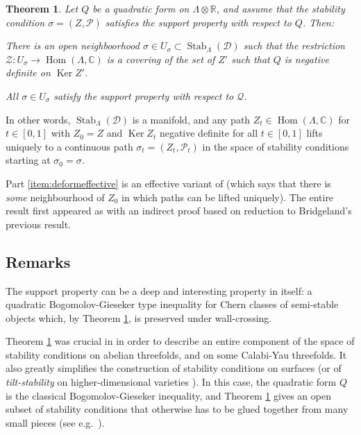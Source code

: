 \documentclass[leqno,11pt,twoside]{amsart}
\makeatletter
\newtheorem*{rep@theorem}{{Conjecture} \ref##}
\newtheorem{Thm}{Theorem}[section]
{\newenvironment{rep{Thm}}[1]{ } \begin{rep@theorem}} \end{rep@theorem}}
\theoremstyle{definition}
\makeatother
\begin{document}
\begin{Thm} \label{thm:mainthm}
Let $Q$ be a quadratic form on $\Lambda \otimes {\ensuremath{\mathbb{R}}}$, and assume that the stability condition
$\sigma = (Z, {\ensuremath{\mathcal P}})$ satisfies the support property with respect to $Q$. Then:
\begin{enumerate*}
\item \label{item:deformeffective}
There is an open neighboorhood $\sigma \in U_\sigma \subset {\mathop{\mathrm{Stab}}\nolimits}_\Lambda({\ensuremath{\mathcal D}})$ such that the
restriction ${\ensuremath{\mathcal Z}} \colon U_\sigma \to {\mathop{\mathrm{Hom}}\nolimits}(\Lambda, {\ensuremath{\mathbb{C}}})$ is a covering of the set of 
$Z'$ such that $Q$ is negative definite on ${\mathop{\mathrm{Ker}}\nolimits} Z'$.
\item \label{item:Qremains}
All $\sigma \in U_\sigma$ satisfy the support property with respect to ${\ensuremath{\mathcal Q}}$.
\end{enumerate*}
\end{Thm}
In other words, ${\mathop{\mathrm{Stab}}\nolimits}_\Lambda({\ensuremath{\mathcal D}})$ is a manifold, and any path
$Z_t \in {\mathop{\mathrm{Hom}}\nolimits}(\Lambda, {\ensuremath{\mathbb{C}}})$ for $t \in [0,1]$ with $Z_0 = Z$ and
${\mathop{\mathrm{Ker}}\nolimits} Z_t$ negative definite for all $t \in [0,1]$ lifts uniquely to a continuous path
$\sigma_t = (Z_t, {\ensuremath{\mathcal P}}_t)$ in the space of stability conditions starting at $\sigma_0 = \sigma$.

Part \eqref{item:deformeffective} is an effective variant of \cite[Theorem 1.2]{Bridgeland:Stab}
(which says that there is \emph{some} neighbourhood of $Z_0$ in which paths can be lifted uniquely). The
entire result first appeared as \cite[Proposition A.5]{BMS:stabCY3s} with an indirect proof based on reduction to Bridgeland's previous result.

\subsection*{Remarks} 
The support property can be a deep and interesting property in itself:
a quadratic Bogomolov-Gieseker type inequality for Chern classes of semi-stable objects which, by
Theorem \ref{thm:mainthm}, is preserved under wall-crossing.

Theorem \ref{thm:mainthm} was crucial in \cite{BMS:stabCY3s} in order to describe an entire
component of the space of stability conditions on abelian threefolds, and on some Calabi-Yau
threefolds. It also greatly simplifies the
construction of stability conditions on surfaces (or of \emph{tilt-stability} on higher-dimensional
varieties \cite{BMT:3folds-BG}). In this case, the quadratic form
$Q$ is the classical Bogomolov-Gieseker inequality, and 
Theorem \ref{thm:mainthm} gives an open subset of stability conditions that
otherwise has to be glued together from many small pieces (see e.g.~\cite[Section 4]{localP2}).
\end{document}
